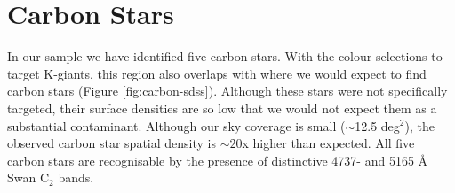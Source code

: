 \documentclass[preprint2]{aastex}
\begin{document}
\section{Carbon Stars}
	
	In our sample we have identified five carbon stars. With the colour selections to target K-giants, this region also overlaps with where we would expect to find carbon stars (Figure \ref{fig:carbon-sdss}). Although these stars were not specifically targeted, their surface densities are so low \citep[$\approx$ 1 per 50 deg$^2$;][]{Green;et-al_1994} that we would not expect them as a substantial contaminant.  Although our sky coverage is small ($\sim$12.5 deg$^2$), the observed carbon star spatial density is $\sim20$x higher than expected. All five carbon stars are recognisable by the presence of distinctive 4737- and 5165 \AA\, Swan C$_2$ bands.

		
\end{document}
